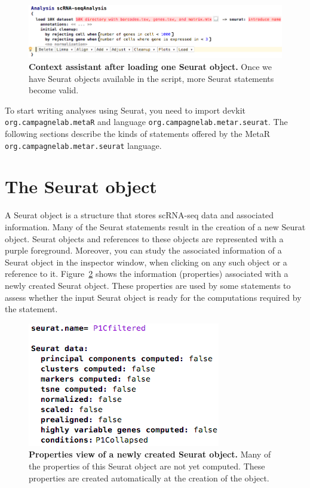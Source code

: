 \begin{figure}[h!tbp]
  \centering
  \includegraphics[width=\figWidthWide]{figures/ContextAssistantMid.png}
    \caption[Context assistant after loading one Seurat object.]{\textbf{Context
    assistant after loading one Seurat object.} Once we have Seurat objects
    available in the script, more Seurat statements become valid.}
\label{fig:ContextAssistantMid}
\end{figure}

To start writing analyses using Seurat, you need to import devkit
\texttt{org\allowbreak.campagne\allowbreak{}lab\allowbreak.metaR}
and language \texttt{org\allowbreak.campagne\allowbreak{}lab\allowbreak.metar\allowbreak.seurat}.
\noindent The following sections describe the kinds of statements offered by the MetaR
\texttt{org\allowbreak.campagne\allowbreak{}lab\allowbreak.metar\allowbreak.seurat} language.

\section{The Seurat object}
A Seurat object is a structure that stores scRNA-seq data and associated information. Many of
the Seurat statements result in the creation of a new Seurat object. Seurat objects and
references to these objects are represented with a purple foreground. Moreover, you can
study the associated information of a Seurat object in the inspector window, when clicking
on any such object or a reference to it. Figure~\ref{fig:PropertiesSeurat} shows the
information (properties) associated with a newly created Seurat object. These properties
are used by some statements to assess whether the input Seurat object is ready for the computations
required by the statement.

\begin{figure}
  \centering
  \includegraphics[width=\figWidthTiny]{figures/PropertiesSeurat.png}
    \caption[Properties view of a newly created Seurat object.]
    {\textbf{Properties view of a newly created Seurat object.} Many of the properties
    of this Seurat object are not yet computed. These properties are created automatically
    at the creation of the object.}
\label{fig:PropertiesSeurat}
\end{figure}

